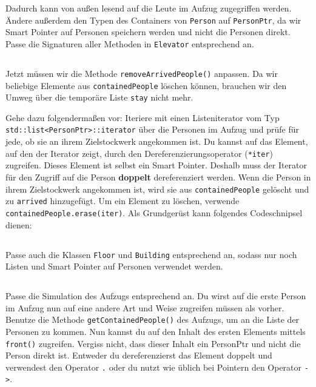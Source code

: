 Dadurch kann von außen lesend auf die Leute im Aufzug zugegriffen werden.
Ändere außerdem den Typen des Containers von \lstinline{Person} auf \lstinline{PersonPtr}, da wir Smart Pointer auf Personen speichern werden und nicht die Personen direkt.
Passe die Signaturen aller Methoden in \lstinline{Elevator} entsprechend an.

\subsection{}
Jetzt müssen wir die Methode \lstinline{removeArrivedPeople()} anpassen.
Da wir beliebige Elemente aus \lstinline{containedPeople} löschen können, brauchen wir den Umweg über die temporäre Liste \lstinline{stay} nicht mehr.

Gehe dazu folgendermaßen vor:
Iteriere mit einen Listeniterator vom Typ \lstinline{std::list<PersonPtr>::iterator} über die Personen im Aufzug und prüfe für jede, ob sie an ihrem Zielstockwerk angekommen ist.
Du kannst auf das Element, auf den der Iterator zeigt, durch den Dereferenzierungsoperator (\lstinline{*iter}) zugreifen.
Dieses Element ist selbst ein Smart Pointer.
Deshalb muss der Iterator für den Zugriff auf die Person \textbf{doppelt} dereferenziert werden.
Wenn die Person in ihrem Zielstockwerk angekommen ist, wird sie aus \lstinline{containedPeople} gelöscht und zu \lstinline{arrived} hinzugefügt.
Um ein Element zu löschen, verwende \lstinline{containedPeople.erase(iter)}.
%
%
Als Grundgerüst kann folgendes Codeschnipsel dienen:



\subsection{}
Passe auch die Klassen \lstinline{Floor} und \lstinline{Building} entsprechend an, sodass nur noch Listen und Smart Pointer auf Personen verwendet werden.

\subsection{}
Passe die Simulation des Aufzugs entsprechend an.
Du wirst auf die erste Person im Aufzug nun auf eine andere Art und Weise zugreifen müssen als vorher.
Benutze die Methode \lstinline{getContainedPeople()} des Aufzugs, um an die Liste der Personen zu kommen.
Nun kannst du auf den Inhalt des ersten Elements mittels \lstinline{front()} zugreifen.
Vergiss nicht, dass dieser Inhalt ein PersonPtr und nicht die Person direkt ist.
Entweder du dereferenzierst das Element doppelt und verwendest den Operator \lstinline{.} oder du nutzt wie üblich bei Pointern den Operator \lstinline{->}.


